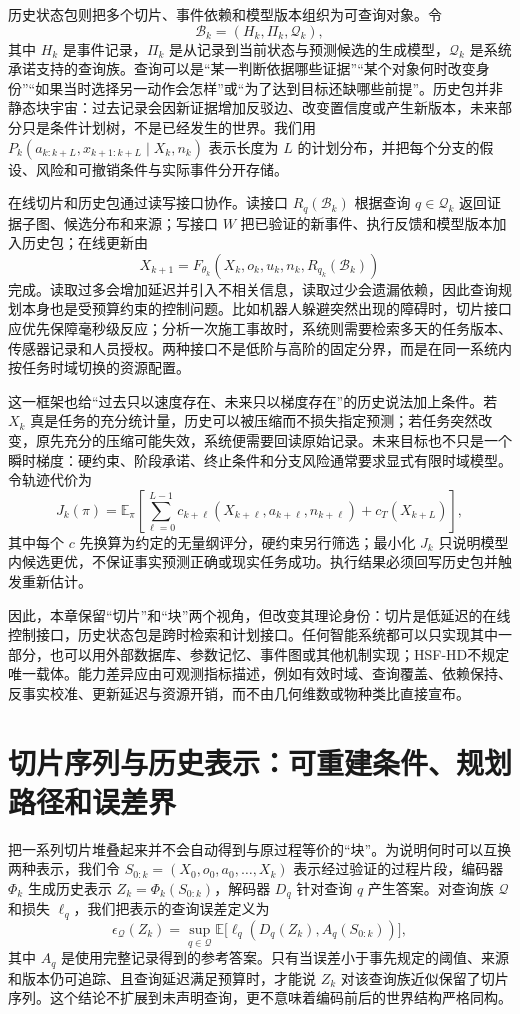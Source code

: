 历史状态包则把多个切片、事件依赖和模型版本组织为可查询对象。令
\[
\mathcal{B}_k=(H_k,\Pi_k,\mathcal{Q}_k),
\]
其中 $H_k$ 是事件记录，$\Pi_k$ 是从记录到当前状态与预测候选的生成模型，$\mathcal{Q}_k$ 是系统承诺支持的查询族。查询可以是“某一判断依据哪些证据”“某个对象何时改变身份”“如果当时选择另一动作会怎样”或“为了达到目标还缺哪些前提”。历史包并非静态块宇宙：过去记录会因新证据增加反驳边、改变置信度或产生新版本，未来部分只是条件计划树，不是已经发生的世界。我们用 $P_k(a_{k:k+L},x_{k+1:k+L}\mid X_k,n_k)$ 表示长度为 $L$ 的计划分布，并把每个分支的假设、风险和可撤销条件与实际事件分开存储。

在线切片和历史包通过读写接口协作。读接口 $R_q(\mathcal{B}_k)$ 根据查询 $q\in\mathcal{Q}_k$ 返回证据子图、候选分布和来源；写接口 $W$ 把已验证的新事件、执行反馈和模型版本加入历史包；在线更新由
\[
X_{k+1}=F_{\theta_k}\!\left(X_k,o_k,u_k,n_k,R_{q_k}(\mathcal{B}_k)\right)
\]
完成。读取过多会增加延迟并引入不相关信息，读取过少会遗漏依赖，因此查询规划本身也是受预算约束的控制问题。比如机器人躲避突然出现的障碍时，切片接口应优先保障毫秒级反应；分析一次施工事故时，系统则需要检索多天的任务版本、传感器记录和人员授权。两种接口不是低阶与高阶的固定分界，而是在同一系统内按任务时域切换的资源配置。

这一框架也给“过去只以速度存在、未来只以梯度存在”的历史说法加上条件。若 $X_k$ 真是任务的充分统计量，历史可以被压缩而不损失指定预测；若任务突然改变，原先充分的压缩可能失效，系统便需要回读原始记录。未来目标也不只是一个瞬时梯度：硬约束、阶段承诺、终止条件和分支风险通常要求显式有限时域模型。令轨迹代价为
\[
J_k(\pi)=\mathbb{E}_{\pi}\!\left[\sum_{\ell=0}^{L-1}c_{k+\ell}(X_{k+\ell},a_{k+\ell},n_{k+\ell})+c_T(X_{k+L})\right],
\]
其中每个 $c$ 先换算为约定的无量纲评分，硬约束另行筛选；最小化 $J_k$ 只说明模型内候选更优，不保证事实预测正确或现实任务成功。执行结果必须回写历史包并触发重新估计。

因此，本章保留“切片”和“块”两个视角，但改变其理论身份：切片是低延迟的在线控制接口，历史状态包是跨时检索和计划接口。任何智能系统都可以只实现其中一部分，也可以用外部数据库、参数记忆、事件图或其他机制实现；HSF-HD不规定唯一载体。能力差异应由可观测指标描述，例如有效时域、查询覆盖、依赖保持、反事实校准、更新延迟与资源开销，而不由几何维数或物种类比直接宣布。

\section{切片序列与历史表示：可重建条件、规划路径和误差界}

把一系列切片堆叠起来并不会自动得到与原过程等价的“块”。为说明何时可以互换两种表示，我们令 $S_{0:k}=(X_0,o_0,a_0,\ldots,X_k)$ 表示经过验证的过程片段，编码器 $\Phi_k$ 生成历史表示 $Z_k=\Phi_k(S_{0:k})$，解码器 $D_q$ 针对查询 $q$ 产生答案。对查询族 $\mathcal{Q}$ 和损失 $\ell_q$，我们把表示的查询误差定义为
\[
\epsilon_{\mathcal{Q}}(Z_k)=\sup_{q\in\mathcal{Q}}
\mathbb{E}\bigl[\ell_q(D_q(Z_k),A_q(S_{0:k}))\bigr],
\]
其中 $A_q$ 是使用完整记录得到的参考答案。只有当误差小于事先规定的阈值、来源和版本仍可追踪、且查询延迟满足预算时，才能说 $Z_k$ 对该查询族近似保留了切片序列。这个结论不扩展到未声明查询，更不意味着编码前后的世界结构严格同构。

